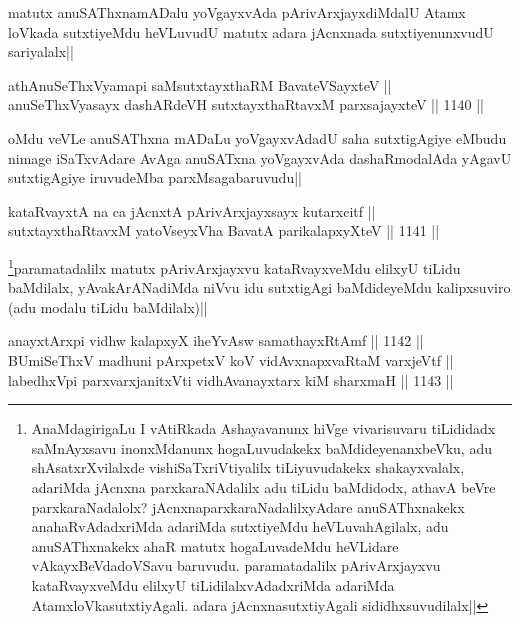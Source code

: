 \begin{artha}
matutx anuSAThxnamADalu yoVgayxvAda pArivArxjayxdiMdalU Atamx loVkada sutxtiyeMdu heVLuvudU matutx adara jAcnxnada sutxtiyenunxvudU sariyalalx||
\end{artha}

\begin{shl}
athAnuSeThxVyamapi saMsutxtayxthaRM BavateVSayxteV || \\
anuSeThxVyasayx dashARdeVH sutxtayxthaRtavxM parxsajayxteV ||  1140 ||  
\end{shl}

\begin{artha}
oMdu veVLe anuSAThxna mADaLu yoVgayxvAdadU saha sutxtigAgiye eMbudu nimage iSaTxvAdare AvAga anuSATxna yoVgayxvAda dashaRmodalAda yAgavU sutxtigAgiye iruvudeMba parxMsagabaruvudu||
\end{artha}

\begin{shl}
kataRvayxtA na ca jAcnxtA pArivArxjayxsayx kutarxcitf ||  \\
sutxtayxthaRtavxM yatoV\s seyxVha BavatA parikalapxyXteV ||  1141 ||  
\end{shl}

\begin{artha}
\footnote{AnaMdagirigaLu I vAtiRkada Ashayavanunx hiVge vivarisuvaru tiLididadx saMnAyxsavu inonxMdanunx hogaLuvudakekx baMdideyenanxbeVku, adu shAsatxrXvilalxde vishiSaTxriVtiyalilx tiLiyuvudakekx shakayxvalalx, adariMda jAcnxna parxkaraNAdalilx adu tiLidu baMdidodx, athavA beVre parxkaraNadalolx? jAcnxnaparxkaraNadalilxyAdare anuSAThxnakekx anahaRvAdadxriMda adariMda sutxtiyeMdu heVLuvahAgilalx, adu anuSAThxnakekx ahaR matutx hogaLuvadeMdu heVLidare vAkayxBeVdadoVSavu baruvudu. paramatadalilx pArivArxjayxvu kataRvayxveMdu elilxyU tiLidilalxvAdadxriMda adariMda AtamxloVkasutxtiyAgali. adara jAcnxnasutxtiyAgali sididhxsuvudilalx||}paramatadalilx matutx pArivArxjayxvu kataRvayxveMdu elilxyU tiLidu baMdilalx, yAvakArANadiMda niVvu idu sutxtigAgi baMdideyeMdu kalipxsuviro (adu modalu tiLidu baMdilalx)||
\end{artha}

\begin{shl}
anayxtArxpi vidhw kalapxyX iheYvAsw samathayxRtAmf ||  1142 || \\
BUmiSeThxV madhuni pArxpetxV koV vidAvxnapxvaRtaM varxjeVtf || \\
labedhxV\s pi parxvarxjanitxVti vidhAvanayxtarx kiM sharxmaH ||  1143 ||  
\end{shl}

